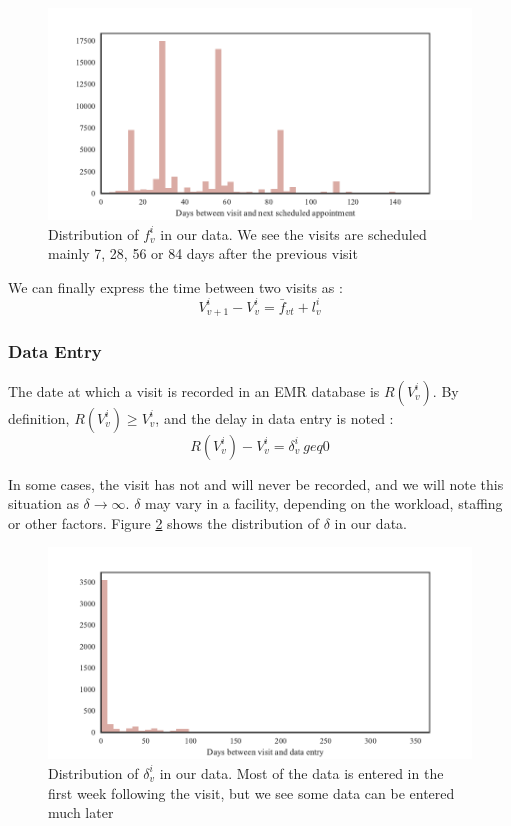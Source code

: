 \begin{center}
\begin{figure}[ht]
\includegraphics[width=\textwidth]{figure/time_to_appointment.pdf}
\caption{Distribution of $f_v^i$ in our data. We see the visits are scheduled mainly 7, 28, 56 or 84 days after the previous visit}
\label{fig:schedule_days}
\end{figure}
\end{center}

We can finally express the time between two visits as :
$$V_{v+1}^i - V_v^i = \bar{f}_{vt} + l_v^i  $$

\subsubsection{Data Entry}

The date at which a visit is recorded in an EMR database is $R(V_v^i)$. By definition, $R(V_v^i) \geq V_v^i$, and the delay in data entry is noted :
$$R(V_v^i) - V_v^i = \delta_v^i \ geq 0$$

In some cases, the visit has not and will never be recorded, and we will note this situation as $\delta \rightarrow \infty$. $\delta$ may vary in a facility, depending on the workload, staffing or other factors. Figure \ref{fig:data_entry_time} shows the distribution of $\delta$ in our data.

\begin{center}
\begin{figure}[ht]
\includegraphics[width=\textwidth]{figure/data_entry_time.pdf}
\caption{Distribution of $\delta_v^i$ in our data. Most of the data is entered in the first week following the visit, but we see some data can be entered much later}
\label{fig:data_entry_time}
\end{figure}
\end{center}

